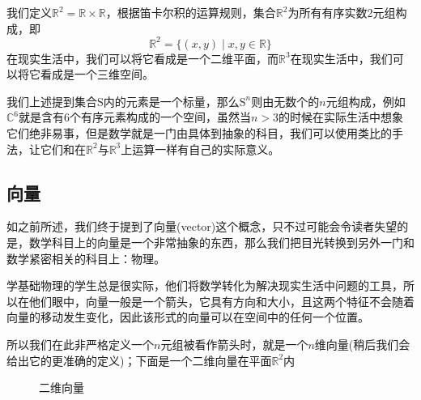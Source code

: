 我们定义$\mathbb{R}^2=\mathbb{R} \times \mathbb{R}$，根据笛卡尔积的运算规则，集合$\mathbb{R}^2$为所有有序实数2元组构成，即$$\mathbb{R}^2=\{(x,y)\mid x,y \in \mathbb{R}\}$$在现实生活中，我们可以将它看成是一个二维平面，而$\mathbb{R}^3$在现实生活中，我们可以将它看成是一个三维空间。

我们上述提到集合$\mathrm{S}$内的元素是一个标量，那么$\mathrm{S}^n$则由无数个的$n$元组构成，例如$\mathbb{C}^6$就是含有6个有序元素构成的一个空间，虽然当$n>3$的时候在实际生活中想象它们绝非易事，但是数学就是一门由具体到抽象的科目，我们可以使用类比的手法，让它们和在$\mathbb{R}^2$与$\mathbb{R}^3$上运算一样有自己的实际意义。

\subsection{向量}

如之前所述，我们终于提到了向量(vector)这个概念，只不过可能会令读者失望的是，数学科目上的向量是一个非常抽象的东西，那么我们把目光转换到另外一门和数学紧密相关的科目上：物理。

学基础物理的学生总是很实际，他们将数学转化为解决现实生活中问题的工具，所以在他们眼中，向量一般是一个箭头，它具有方向和大小，且这两个特征不会随着向量的移动发生变化，因此该形式的向量可以在空间中的任何一个位置。

所以我们在此非严格定义一个$n$元组被看作箭头时，就是一个$n$维向量(稍后我们会给出它的更准确的定义)；下面是一个二维向量在平面$\mathbb{R}^2$内

\begin{figure}[htbp]    %
		\centering            %
		\caption{二维向量}    %
		\label{fig:intro.vector}            %
\end{figure}

